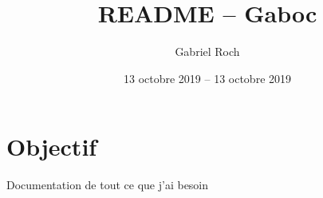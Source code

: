 \documentclass[a4paper,11pt]{article}
\title{README -- Gaboc}
\author{Gabriel Roch}
\date{13 octobre 2019 -- 13 octobre 2019}
\begin{document}
\maketitle
\tableofcontents

\section{Objectif}

Documentation de tout ce que j'ai besoin
\end{document}
